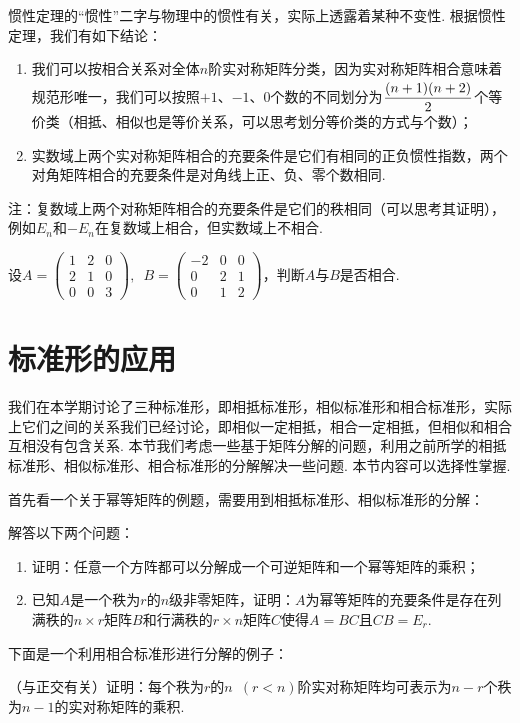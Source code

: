 惯性定理的``惯性''二字与物理中的惯性有关，实际上透露着某种不变性. 根据惯性定理，我们有如下结论：
\begin{enumerate}
    \item 我们可以按相合关系对全体$n$阶实对称矩阵分类，因为实对称矩阵相合意味着规范形唯一，我们可以按照$+1$、$-1$、0个数的不同划分为$\vphantom{\cfrac{(n+1)(n+2)}{2}}\dfrac{(n+1)(n+2)}{2}$个等价类（相抵、相似也是等价关系，可以思考划分等价类的方式与个数）；

    \item 实数域上两个实对称矩阵相合的充要条件是它们有相同的正负惯性指数，两个对角矩阵相合的充要条件是对角线上正、负、零个数相同.
\end{enumerate}
注：复数域上两个对称矩阵相合的充要条件是它们的秩相同（可以思考其证明），例如$E_n$和$-E_n$在复数域上相合，但实数域上不相合.
\begin{example}
    设$A=\begin{pmatrix}
            1 & 2 & 0 \\ 2 & 1 & 0 \\ 0 & 0 & 3
        \end{pmatrix},\enspace B=\begin{pmatrix}
            -2 & 0 & 0 \\ 0 & 2 & 1 \\ 0 & 1 & 2
        \end{pmatrix}$，判断$A$与$B$是否相合.
\end{example}

\section{标准形的应用}

我们在本学期讨论了三种标准形，即相抵标准形，相似标准形和相合标准形，实际上它们之间的关系我们已经讨论，即相似一定相抵，相合一定相抵，但相似和相合互相没有包含关系. 本节我们考虑一些基于矩阵分解的问题，利用之前所学的相抵标准形、相似标准形、相合标准形的分解解决一些问题. 本节内容可以选择性掌握.

首先看一个关于幂等矩阵的例题，需要用到相抵标准形、相似标准形的分解：
\begin{example}
    解答以下两个问题：
    \begin{enumerate}
        \item 证明：任意一个方阵都可以分解成一个可逆矩阵和一个幂等矩阵的乘积；

        \item 已知$A$是一个秩为$r$的$n$级非零矩阵，证明：$A$为幂等矩阵的充要条件是存在列满秩的$n\times r$矩阵$B$和行满秩的$r\times n$矩阵$C$使得$A=BC$且$CB=E_r$.
    \end{enumerate}
\end{example}
下面是一个利用相合标准形进行分解的例子：
\begin{example}
    （与正交有关）证明：每个秩为$r$的$n\enspace(r<n)$阶实对称矩阵均可表示为$n-r$个秩为$n-1$的实对称矩阵的乘积.
\end{example}

